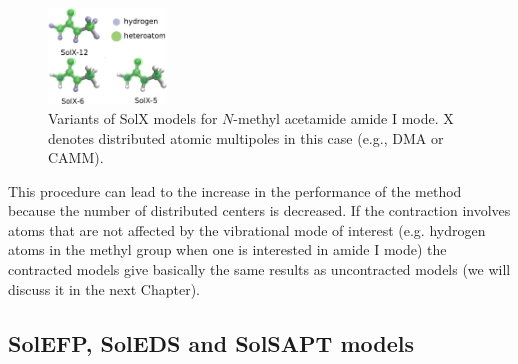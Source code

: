 \documentclass[a4paper,titlepage,twoside,fleqn,12pt]{book}
\begin{document}
\begin{refsection}
\begin{figure}
\vspace{-30pt}
\begin{center}
    \includegraphics[width=0.28\textwidth]{SolXn.eps}
  \end{center}
  \vspace{-18pt}
  \caption{Variants of SolX models for $N$-methyl acetamide amide I mode.
X denotes distributed atomic multipoles in this case (e.g., DMA or CAMM).\label{f:solxn}}
\vspace{-20pt}
\end{figure}
%
\noindent This procedure can lead to the increase in the performance
of the method because the number of distributed centers
is decreased. If the contraction involves atoms that 
are not affected by the vibrational mode of interest (e.g. 
hydrogen atoms in the methyl group when one is interested
in amide I mode) the contracted models give basically 
the same results as uncontracted models (we 
will discuss it in the next Chapter). 

\subsection{SolEFP, SolEDS and SolSAPT models}


\end{refsection}
\end{document}
